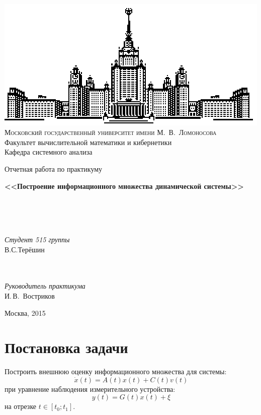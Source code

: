 \documentclass[12pt]{article}
\begin{document}
\thispagestyle{empty}

\begin{center}
\ \vspace{-3cm}

\includegraphics[width=0.5\linewidth]{msu}\\

{\scshape Московский государственный университет имени М.~В.~Ломоносова}\\
Факультет вычислительной математики и кибернетики\\
Кафедра системного анализа
\vfill

{\LARGE Отчетная работа по практикуму}

\vspace{1cm}
{\Huge\bfseries <<Построение информационного множества динамической системы>>}

~\\
~\\
~\\

\begin{flushright}
  \large
  \textit{Студент 515 группы}\\
  В.С.Терёшин

 \vspace{5mm}
  ~\\
  ~\\

  \textit{Руководитель практикума}\\
   И.\,В.~Востриков

\end{flushright}

\end{center}

\vfill

\begin{center}
Москва, 2015
\end{center}

\newpage

\tableofcontents

\newpage

\section{Постановка задачи}
Построить внешнюю оценку информационного множества для системы:
$$\dot{x}(t) = A(t)x(t) + C(t)v(t)$$
при уравнение наблюдения измерительного устройства:
$$y(t) = G(t)x(t) + \xi$$
на отрезке $t \in [t_0;t_1]$.
\end{document}
